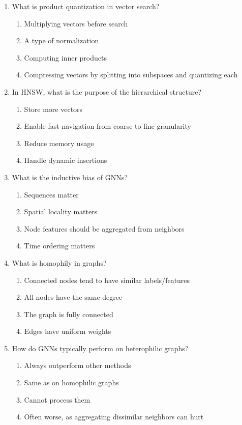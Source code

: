 \documentclass[12pt,a4paper]{article}
\begin{document}
\begin{enumerate}
\item What is product quantization in vector search?
\begin{enumerate}[label=\Alph*)]
    \item Multiplying vectors before search
    \item A type of normalization
    \item Computing inner products
    \item Compressing vectors by splitting into subspaces and quantizing each
\end{enumerate}

\item In HNSW, what is the purpose of the hierarchical structure?
\begin{enumerate}[label=\Alph*)]
    \item Store more vectors
    \item Enable fast navigation from coarse to fine granularity
    \item Reduce memory usage
    \item Handle dynamic insertions
\end{enumerate}

\item What is the inductive bias of GNNs?
\begin{enumerate}[label=\Alph*)]
    \item Sequences matter
    \item Spatial locality matters
    \item Node features should be aggregated from neighbors
    \item Time ordering matters
\end{enumerate}

\item What is homophily in graphs?
\begin{enumerate}[label=\Alph*)]
    \item Connected nodes tend to have similar labels/features
    \item All nodes have the same degree
    \item The graph is fully connected
    \item Edges have uniform weights
\end{enumerate}

\item How do GNNs typically perform on heterophilic graphs?
\begin{enumerate}[label=\Alph*)]
    \item Always outperform other methods
    \item Same as on homophilic graphs
    \item Cannot process them
    \item Often worse, as aggregating dissimilar neighbors can hurt
\end{enumerate}


\end{enumerate}
\end{document}

